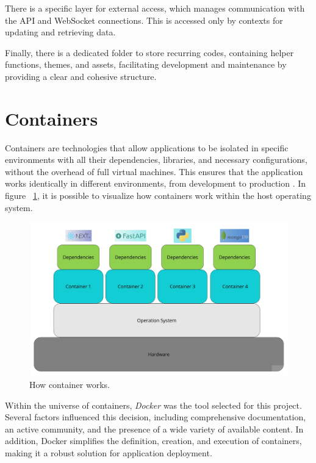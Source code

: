 There is a specific layer for external access, which manages communication with the \gls{API} and WebSocket connections. This is accessed only by contexts for updating and retrieving data.

Finally, there is a dedicated folder to store recurring codes, containing helper functions, themes, and assets, facilitating development and maintenance by providing a clear and cohesive structure.


\section{Containers}
Containers are technologies that allow applications to be isolated in specific environments with all their dependencies, libraries, and necessary configurations, without the overhead of full virtual machines. This ensures that the application works identically in different environments, from development to production \cite{paraiso2016model}. In figure ~\ref{fig:container}, it is possible to visualize how containers work within the host operating system.

\begin{figure}[htbp]
	\centering
	\includegraphics[width=\textwidth]{images/container.jpg}
	\caption{How container works.}
	\label{fig:container}
\end{figure}

Within the universe of containers, \textit{Docker} \cite{dockerDocs} was the tool selected for this project. Several factors influenced this decision, including comprehensive documentation, an active community, and the presence of a wide variety of available content. In addition, Docker simplifies the definition, creation, and execution of containers, making it a robust solution for application deployment.

